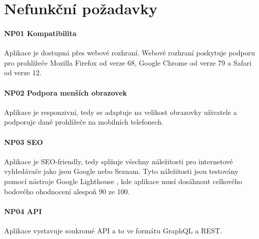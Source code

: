 \section{Nefunkční požadavky}
\label{sc:non_func_req}

\noindent \begin{minipage}{\textwidth}
    \paragraph{NP01 Kompatibilita}
    \begin{smallindent}{}
        Aplikace je dostupná přes webové rozhraní. Webové rozhraní poskytuje podporu pro prohlížeče Mozilla Firefox od verze 68, Google Chrome od verze 79 a Safari od verze 12.
    \end{smallindent}
\end{minipage}


\noindent \begin{minipage}{\textwidth}
    \paragraph{NP02 Podpora menších obrazovek}
    \begin{smallindent}{}
        Aplikace je responzivní, tedy se adaptuje na velikost obrazovky uživatele a podporuje dané prohlížeče na mobilních telefonech.
    \end{smallindent}
\end{minipage}

\noindent \begin{minipage}{\textwidth}
    \paragraph{NP03 SEO}
    \begin{smallindent}{}
        Aplikace je SEO-friendly, tedy splňuje všechny náležitosti pro internetové vyhledávače jako jsou Google nebo Seznam. Tyto náležitosti jsou testovány pomocí nástroje Google Lighthouse \cite{googlellc_2019_lighthouse}, kde aplikace musí dosáhnout celkového bodového ohodnocení alespoň 90 ze 100.
    \end{smallindent}
\end{minipage}

\noindent \begin{minipage}{\textwidth}
    \paragraph{NP04 API}
    \begin{smallindent}{}
        Aplikace vystavuje soukromé API a to ve formátu GraphQL a REST.
    \end{smallindent}
\end{minipage}

